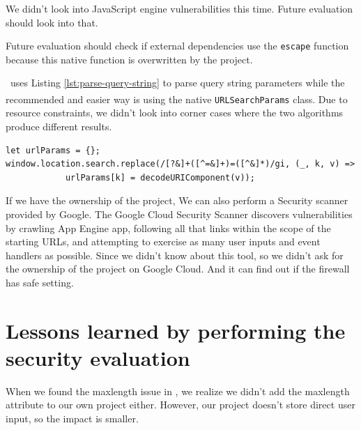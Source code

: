 \documentclass[12pt, a4paper]{article}
\newcommand{\code}[1]{\texttt{#1}}
\begin{document}


We didn't look into JavaScript engine vulnerabilities this time. Future evaluation should look into that.

Future evaluation should check if external dependencies use the \code{escape} function because this native function is overwritten by the project.

\theproject\ uses Listing \ref{lst:parse-query-string} to parse query string parameters while the recommended and easier way is using the native \code{URLSearchParams} class\textsuperscript{\cite{URLSearchParams}}. Due to resource constraints, we didn't look into corner cases where the two algorithms produce different results.

\begin{lstlisting}[frame=tb, caption=parse query string parameters by regular expression, label=lst:parse-query-string]
let urlParams = {};
window.location.search.replace(/[?&]+([^=&]+)=([^&]*)/gi, (_, k, v) =>
            urlParams[k] = decodeURIComponent(v));
\end{lstlisting}

If we have the ownership of the project, We can also perform a Security scanner provided by Google. The Google Cloud Security Scanner discovers vulnerabilities by crawling App Engine app, following all that links within the scope of the starting URLs, and attempting to exercise as many user inputs and event handlers as possible.  Since we didn't know about this tool, so we didn't ask for the ownership of the project on Google Cloud. And it can find out if the firewall has safe setting.


\section{Lessons learned by performing the security evaluation}

When we found the maxlength issue in \theproject, we realize we didn't add the maxlength attribute to our own project either. However, our project doesn't store direct user input, so the impact is smaller.
\end{document}
